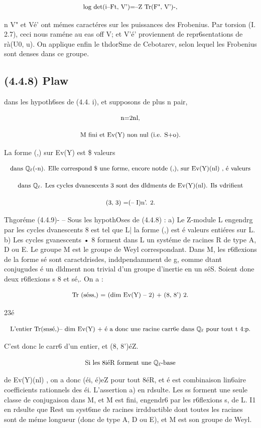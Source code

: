 \documentclass[11pt]{article}
\theoremstyle{remark}
\begin{document}
\[\text{\small log det(i--Ft, V')=--Z Tr(F", V')-,}\]

n V" et Vé' ont mémes caractéres sur les puissances des Frobenius. Par torsion (I. 2.7), ceci nous raméne au eas off V; et V'é' proviennent de repr6sentations de rà(U0, u). On applique enfin le thdorSme de Cebotarev, selon lequel les Frobenius sont denses dans ce groupe.

\subsection*{(4.4.8) Plaw}

dans les hypoth6ses de (4.4. i), et supposons de plus n pair,

\[\text{\small n=2nl,}\]

\[\text{\small M fini et Ev(Y) non nul (i.e. S+o).}\]

La forme (,) sur Ev(Y) est \$ valeurs

\[\text{\small dans \(\mathbb{Q}_{\ell}\)(-n). Elle correspond \$ une forme, encore notde (,), sur Ev(Y)(nl) , é valeurs}\]

\[\text{\small dans \(\mathbb{Q}_{\ell}\). Les cycles dvanescents 3 sont des dldments de Ev(Y)(nl). Ils vdrifient}\]

\[\text{\small (3, 3) =(-- I)n'. 2.}\]

Thgoréme (4.4.9)- -- Sous les hypothOses de (4.4.8) : a) Le Z-module L engendrg par les cycles dvanescents 8 est tel que L| la forme (,) est é valeurs entiéres sur L. b) Les cycles gvanescents • 8 forment dans L un systéme de racines R de type A, D ou E. Le groupe M est le groupe de Weyl correspondant. Dans M, les r6flexions de la forme sé sont caractdrisdes, inddpendamment de g, eomme dtant conjugudes é un dldment non trivial d'un groupe d'inertie en un séS. Soient done deux r6flexions s 8 et sé,. On a :

\[\text{\small Tr (séss,) = (dim Ev(Y) -- 2) + (8, 8') 2.}\]

23é

\[\text{\small L'entier Tr(snsé,)-- dim Ev(Y) + é a donc une racine carr6e dans \(\mathbb{Q}_{\ell}\) pour tout t 4:p.}\]

C'est donc le carr6 d'un entier, et (8, 8')éZ.

\[\text{\small Si les 8iéR forment une \(\mathbb{Q}_{\ell}\)-base}\]

de Ev(Y)(nl) , on a donc (éi, é)eZ pour tout 8éR, et é est combinaison lin6aire coefficients rationnels des éi. L'assertion a) en rdsulte. Les ss forment une seule classe de conjugaison dans M, et M est fini, engendr6 par les r6flexions s, de L. I1 en rdsulte que Rest un syst6me de racines irrdductible dont toutes les racines sont de méme longueur (donc de type A, D ou E), et M est son groupe de Weyl.
\end{document}
